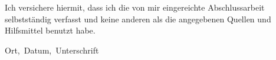 \startsubject[title=Erklärung]

Ich versichere hiermit, dass ich die von mir eingereichte Abschlussarbeit
selbstständig verfasst und keine anderen als die angegebenen Quellen und
Hilfsmittel benutzt habe.

\blank[20mm]

\blackrule[width=12cm,height=0.2mm]
\hbox{\hbox{\small Ort, Datum, Unterschrift}}

\stopsubject

